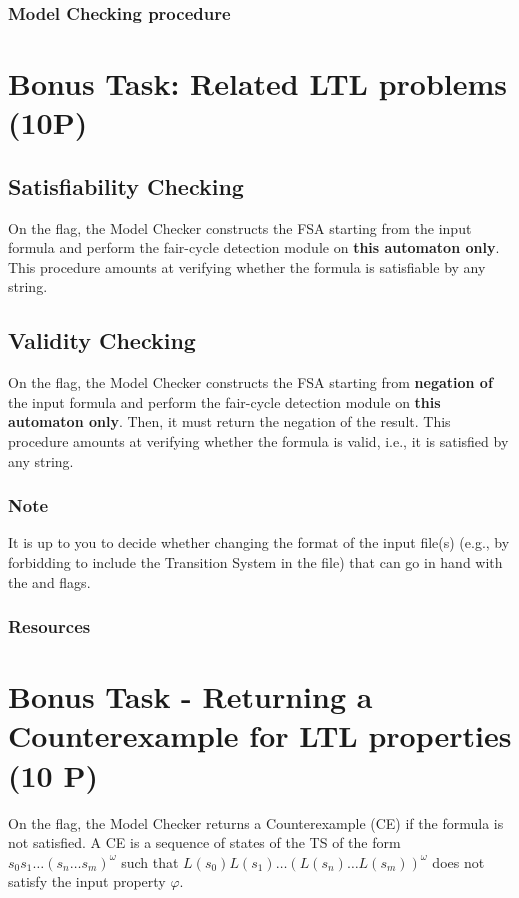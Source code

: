 \documentclass{article}
\begin{document}
\subsubsection*{Model Checking procedure}



\section{Bonus Task: Related LTL problems (10P)} \label{sec::bonus1}

\subsection{Satisfiability Checking}
On the  flag, the Model Checker constructs the FSA starting from the input formula
and perform the fair-cycle detection module on \textbf{this automaton only}. 
This procedure amounts at verifying whether the formula is satisfiable by any string. 

\subsection{Validity Checking}
On the  flag, the Model Checker constructs the FSA starting from \textbf{negation of} 
the input formula and perform the fair-cycle detection module on \textbf{this automaton only}. 
Then, it must return the negation of the result.
This procedure amounts at verifying whether the formula is valid, i.e., it is satisfied by any string. 

\subsubsection*{Note}
It is up to you to decide whether changing the format of the input file(s)
(e.g., by forbidding to include the Transition System in the file) 
that can go in hand with the  and  flags.

\subsubsection*{Resources}
\cite[Paragraph 5.2.2]{BaKa}

\section{Bonus Task - Returning a Counterexample for LTL properties (10 P)} \label{sec::bonus2}
On the  flag, the Model Checker returns a Counterexample (CE) if the formula is 
not satisfied. A CE is a sequence of states of the TS of the form $s_0s_1 \dots (s_n \dots s_m )^{\omega}$
such that $L(s_0)L(s_1) \dots (L(s_n) \dots L(s_m) )^{\omega}$ does not satisfy the input property $\varphi$.
\end{document}

